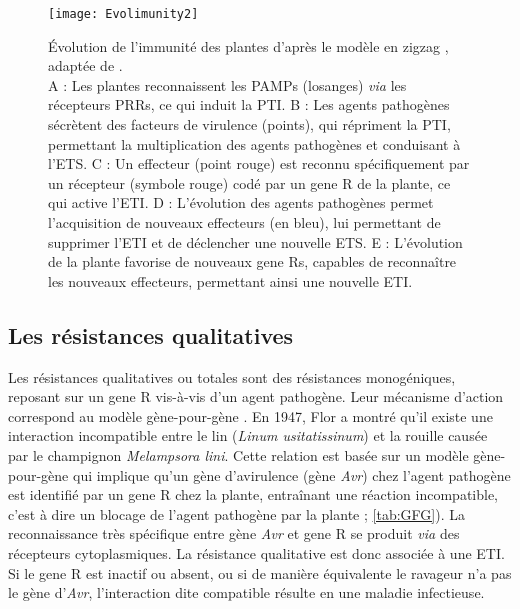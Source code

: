  \begin{figure}[ht]
  \centering \texttt{[image: Evolimunity2]}
	\caption[Évolution de l'immunité des plantes d’après le modèle en \og zigzag \fg]{Évolution de l’immunité des 
	 plantes d’après le modèle en \og zigzag \fg, adaptée de \citet{Jones2006}. \\ 
	 A : Les plantes reconnaissent les \glspl{PAMP} (losanges) \textit{via} les
	 récepteurs \glspl{PRR}, ce qui induit la \gls{PTI}. B : Les agents pathogènes sécrètent des facteurs   
	 de virulence (points), qui répriment la \gls{PTI}, permettant la multiplication des agents pathogènes et  
	 conduisant à l’\gls{ETS}. C : Un effecteur  (point rouge) est reconnu spécifiquement par un récepteur (symbole 
	 rouge) codé par un \gls{gene R} de la plante, ce qui active l’\gls{ETI}. D : L’évolution des agents pathogènes  
	 permet l'acquisition de nouveaux effecteurs (en bleu), lui permettant de supprimer l’\gls{ETI} et de déclencher 
	 une nouvelle \gls{ETS}. 
	 E : L’évolution de la plante favorise  de nouveaux \glspl{gene R}, capables de reconnaître les nouveaux 
	 effecteurs, permettant ainsi une nouvelle \gls{ETI}.}
   \label{fig:zigzag}
 \end{figure}
	
      
\subsection{Les résistances qualitatives}
	
	Les résistances qualitatives ou totales sont des résistances monogéniques, reposant sur un \gls{gene R} vis-à-vis d’un agent pathogène. Leur mécanisme d’action  correspond au 
modèle \og gène-pour-gène \fg{}\citep{Flor1971, Moury2010, Thrall2016}.
En 1947, Flor a montré qu'il existe une interaction incompatible entre le lin (\textit{Linum usitatissinum}) et la rouille causée par le champignon\textit{ Melampsora lini}.  Cette relation est basée sur un modèle  gène-pour-gène qui implique qu'un gène d'avirulence (gène \textit{Avr}) chez l’agent pathogène est identifié par un \gls{gene R} chez la plante, entraînant une réaction incompatible, c’est à
dire un blocage de l’agent pathogène par la plante \citep{Dangl2001, Jones2006}; \autoref{tab:GFG}). La reconnaissance très spécifique entre gène \textit{Avr} et \gls{gene R} se produit \textit{via} des récepteurs cytoplasmiques. La résistance qualitative est donc associée à une \gls{ETI}.
Si le \gls{gene R} est inactif ou absent, ou si de manière équivalente le ravageur n'a pas le gène d'\textit{Avr}, l'interaction dite compatible résulte  en une maladie infectieuse. 
	
